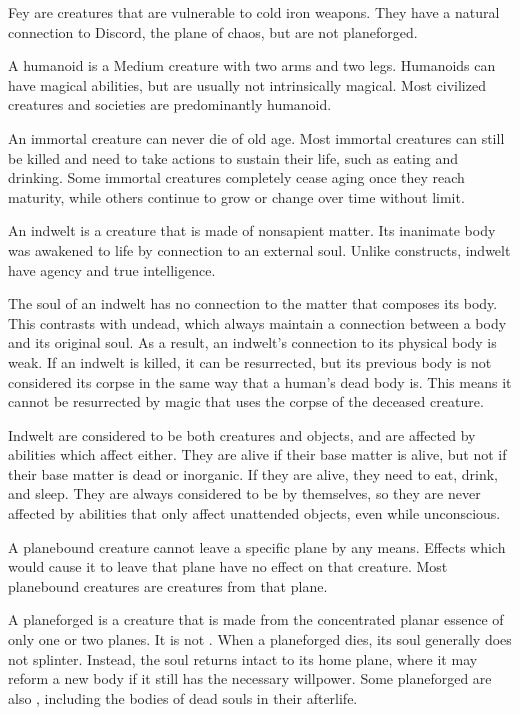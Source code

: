   Fey are \magical creatures that are vulnerable to cold iron weapons.
  They have a natural connection to Discord, the plane of chaos, but are not planeforged.

  A humanoid is a Medium creature with two arms and two legs.
  Humanoids can have magical abilities, but are usually not intrinsically magical.
  Most civilized creatures and societies are predominantly humanoid.

  An immortal creature can never die of old age.
  Most immortal creatures can still be killed and need to take actions to sustain their life, such as eating and drinking.
  Some immortal creatures completely cease aging once they reach maturity, while others continue to grow or change over time without limit.

  An indwelt is a creature that is made of nonsapient matter.
  Its inanimate body was awakened to life by connection to an external soul.
  Unlike constructs, indwelt have agency and true intelligence.

  The soul of an indwelt has no connection to the matter that composes its body.
  This contrasts with undead, which always maintain a connection between a body and its original soul.
  As a result, an indwelt's connection to its physical body is weak.
  If an indwelt is killed, it can be resurrected, but its previous body is not considered its corpse in the same way that a human's dead body is.
  This means it cannot be resurrected by magic that uses the corpse of the deceased creature.

  Indwelt are considered to be both creatures and objects, and are affected by abilities which affect either.
  They are alive if their base matter is alive, but not if their base matter is dead or inorganic.
  If they are alive, they need to eat, drink, and sleep.
  They are always considered to be  by themselves, so they are never affected by abilities that only affect unattended objects, even while unconscious.

  A planebound creature cannot leave a specific plane by any means.
  Effects which would cause it to leave that plane have no effect on that creature.
  Most planebound creatures are  creatures from that plane.

  A planeforged is a creature that is made from the concentrated planar essence of only one or two planes.
  It is not .
  When a planeforged dies, its soul generally does not splinter.
  Instead, the soul returns intact to its home plane, where it may reform a new body if it still has the necessary willpower.
  Some planeforged are also , including the bodies of dead souls in their afterlife.

